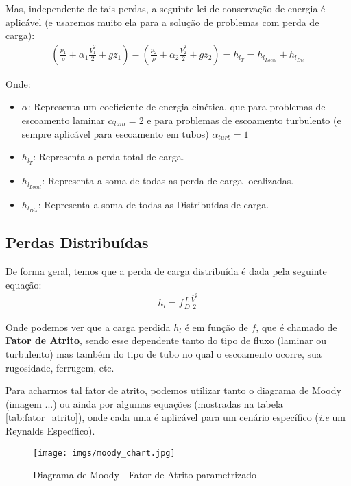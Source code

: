 \documentclass{article}
\begin{document}
Mas, independente de tais perdas, a seguinte lei de conservação de energia é aplicável (e usaremos muito ela para a solução de problemas com perda de carga):
\begin{align}
    \left(\frac{p_1}{\rho} + \alpha_1 \frac{\bar{V}^2_1}{2} + gz_1\right) - \left(\frac{p_2}{\rho} + \alpha_2 \frac{\bar{V}^2_2}{2} + gz_2\right) = h_{l_{T}} = h_{l_{Local}} + h_{l_{Dis}}
\end{align}

Onde:
\begin{itemize}
    \item $\alpha$: Representa um coeficiente de energia cinética, que para problemas de escoamento laminar $\alpha_{lam} = 2$ e para problemas de escoamento turbulento (e sempre aplicável para escoamento em tubos) $\alpha_{turb} = 1$
    \item $h_{l_{T}}$: Representa a perda total de carga.
    \item $h_{l_{Local}}$: Representa a soma de todas as perda de carga localizadas.
    \item $h_{l_{Dis}}$: Representa a soma de todas as Distribuídas de carga.
\end{itemize}

\newpage
\subsection{Perdas Distribuídas}

De forma geral, temos que a perda de carga distribuída é dada pela seguinte equação:
\begin{align}
    h_{l} = f \frac{L}{D}\frac{\bar{V}^2}{2}
    \label{eq:perda_carga_distribuida}
\end{align}

Onde podemos ver que a carga perdida $h_l$ é em função de $f$, que é chamado de \textbf{Fator de Atrito}, sendo esse dependente tanto do tipo de fluxo (laminar ou turbulento) mas também do tipo de tubo no qual o escoamento ocorre, sua rugosidade, ferrugem, etc.

Para acharmos tal fator de atrito, podemos utilizar tanto o diagrama de Moody (imagem ...) ou ainda por algumas equações (mostradas na tabela \ref{tab:fator_atrito}), onde cada uma é aplicável para um cenário específico (\emph{i.e} um Reynalds Específico).

\begin{figure}[h]
    \centering
    \texttt{[image: imgs/moody\_chart.jpg]}
    \caption{Diagrama de Moody - Fator de Atrito parametrizado}
\end{figure}
\end{document}
